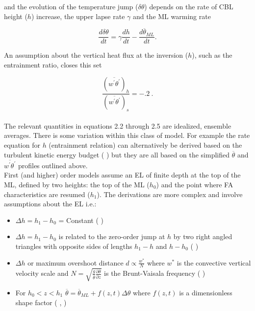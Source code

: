 and the evolution of the temperature jump ($\delta \theta$) depends on the rate of \acs{CBL} height ($h$) increase, the upper lapse rate $\gamma$ and the \acs{ML} warming rate
  
\begin{equation}
\frac{d\delta \theta}{dt} = \gamma\frac{dh}{dt} - \frac{d\overline{\theta}_{ML}}{dt}.
\end{equation}

An assumption about the vertical heat flux at the inversion ($h$), such as the entrainment ratio, closes this set

\begin{equation}
\frac{(\overline{w^{'}\theta^{'}})_{h}}{(\overline{w^{'}\theta^{'}})_{s}} = -.2 \ .
\end{equation}\\

The relevant quantities in equations 2.2 through 2.5 are idealized, ensemble averages. There is some variation within this class of model.  For example the rate equation for $h$ (entrainment relation) can alternatively be derived based on the turbulent kinetic energy budget (\citeauthor{FedConzMir04} \citeyear{FedConzMir04}) but they are all based on the simplified $\overline{\theta}$ and $\overline{w^{'}\theta^{'}}$ profiles outlined above.\\  

First (and higher) order models assume an \acs{EL} of finite depth at the top of the ML, defined by two heights:  the top of the ML ($h_{0}$) and the point where \acs{FA} characteristics are resumed ($h_{1}$).  The derivations are more complex and involve assumptions about the \acs{EL} i.e.: 

\begin{itemize}
\item{$\Delta h = h_{1} - h_{0}$ = Constant (\citeauthor{Betts74} \citeyear{Betts74})}

\item{$\Delta h = h_{1} - h_{0}$ is related to the zero-order jump at $h$ by two right angled triangles with opposite sides
of lengths $h_{1} - h$ and $h - h_{0}$ (\citeauthor{BatchGryn} \citeyear{BatchGryn})}

\item{$\Delta h$ or maximum overshoot distance $d \propto \frac{w^{*}}{N}$ where $w^{*}$ is the convective vertical velocity scale and $N = \sqrt{\frac{g}{\overline{\theta}} \frac{\partial \overline{\theta}}{\partial z}}$ is the Brunt-Vaisala frequency (\citeauthor{Stull73} \citeyear{Stull73})}
 
\item{For $h_{0}<z<h_{1}$ $\overline{\theta} = \overline{\theta}_{ML} + f(z,t) \Delta \theta$ where $f(z,t)$ is a dimensionless shape factor (\citeauthor{Deardorff79} \citeyear{Deardorff79}, \citeauthor{FedConzMir04} \citeyear{FedConzMir04})}
\end{itemize}
 \\

